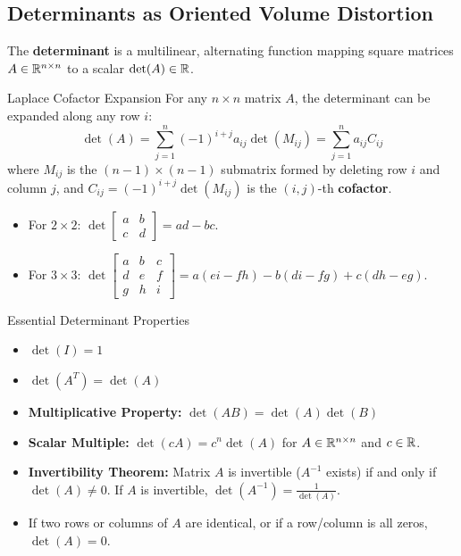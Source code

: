 \subsection{Determinants as Oriented Volume Distortion}

The \textbf{determinant} is a multilinear, alternating function mapping square matrices $A \in \mathbb{R}^{n \times n}$ to a scalar $\det(A) \in \mathbb{R}$.

\begin{definitionbox}{Laplace Cofactor Expansion}
For any $n \times n$ matrix $A$, the determinant can be expanded along any row $i$:
\begin{equation}
\det(A) = \sum_{j=1}^n (-1)^{i+j} a_{ij} \det(M_{ij}) = \sum_{j=1}^n a_{ij} C_{ij}
\end{equation}
where $M_{ij}$ is the $(n-1) \times (n-1)$ submatrix formed by deleting row $i$ and column $j$, and $C_{ij} = (-1)^{i+j} \det(M_{ij})$ is the $(i, j)$-th \textbf{cofactor}.
\begin{itemize}
    \item For $2 \times 2$: $\det \begin{bmatrix} a & b \\ c & d \end{bmatrix} = ad - bc$.
    \item For $3 \times 3$: $\det \begin{bmatrix} a & b & c \\ d & e & f \\ g & h & i \end{bmatrix} = a(ei - fh) - b(di - fg) + c(dh - eg)$.
\end{itemize}
\end{definitionbox}

\begin{theorembox}{Essential Determinant Properties}
\begin{itemize}
    \item $\det(I) = 1$
    \item $\det(A^T) = \det(A)$
    \item \textbf{Multiplicative Property:} $\det(AB) = \det(A) \det(B)$
    \item \textbf{Scalar Multiple:} $\det(c A) = c^n \det(A)$ for $A \in \mathbb{R}^{n \times n}$ and $c \in \mathbb{R}$.
    \item \textbf{Invertibility Theorem:} Matrix $A$ is invertible ($A^{-1}$ exists) if and only if $\det(A) \neq 0$. If $A$ is invertible, $\det(A^{-1}) = \frac{1}{\det(A)}$.
    \item If two rows or columns of $A$ are identical, or if a row/column is all zeros, $\det(A) = 0$.
\end{itemize}
\end{theorembox}

